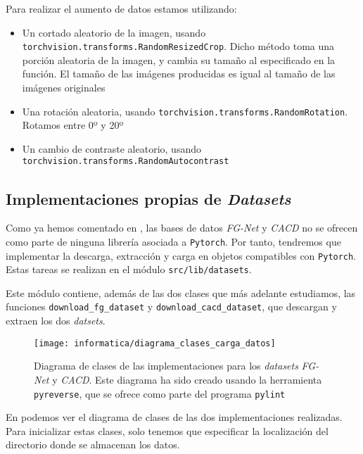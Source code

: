 Para realizar el aumento de datos estamos utilizando:

\begin{itemize}
    \item Un cortado aleatorio de la imagen, usando \lstinline{torchvision.transforms.RandomResizedCrop}. Dicho método toma una porción aleatoria de la imagen, y cambia su tamaño al especificado en la función. El tamaño de las imágenes producidas es igual al tamaño de las imágenes originales
    \item Una rotación aleatoria, usando \lstinline{torchvision.transforms.RandomRotation}. Rotamos entre 0º y 20º
    \item Un cambio de contraste aleatorio, usando \lstinline{torchvision.transforms.RandomAutocontrast}
\end{itemize}

\subsection{Implementaciones propias de \textit{Datasets}} \label{isec:datasets_customs}

Como ya hemos comentado en , las bases de datos \textit{FG-Net} y \textit{CACD} no se ofrecen como parte de ninguna librería asociada a \lstinline{Pytorch}. Por tanto, tendremos que implementar la descarga, extracción y carga en objetos compatibles con \lstinline{Pytorch}. Estas tareas se realizan en el módulo \lstinline{src/lib/datasets}.

Este módulo contiene, además de las dos clases que más adelante estudiamos, las funciones \lstinline{download_fg_dataset} y \lstinline{download_cacd_dataset}, que descargan y extraen los dos \textit{datsets}.

\begin{figure}[H]
    \centering
    \texttt{[image: informatica/diagrama\_clases\_carga\_datos]}
    \caption{Diagrama de clases de las implementaciones para los \textit{datasets} \textit{FG-Net} y \textit{CACD}. Este diagrama ha sido creado usando la herramienta \lstinline{pyreverse}, que se ofrece como parte del programa \lstinline{pylint}}
    \label{img:diagrama_clases_datasets}
\end{figure}

En  podemos ver el diagrama de clases de las dos implementaciones realizadas. Para inicializar estas clases, solo tenemos que especificar la localización del directorio donde se almacenan los datos.

